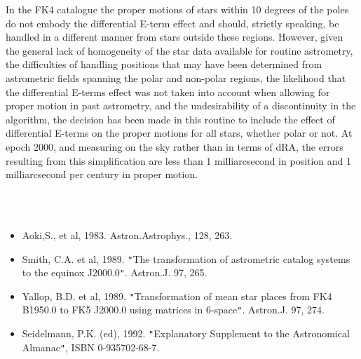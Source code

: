 \documentclass[twoside,11pt]{article}
\renewcommand{\_}{\texttt{\symbol{95}}}
\newcommand{\sstdiytopic}[2]{\item[{\hspace{-0.35em}#1\hspace{-0.35em}:}]
\mbox{} \\[1.3ex] #2}
\newcommand{\sstitemlist}[1]{
  \mbox{} \\
  \vspace{-3.5ex}
  \begin{itemize}
     #1
  \end{itemize}
}
\newcommand{\sstitem}{\item}
\newcommand{\sstdiytopic}[2]{\item[{#1}] #2 }
\newcommand{\sstitemlist}[1]{
      \begin{itemize}
         #1
      \end{itemize}
      \\
   }
\newcommand{\sstitem}{\item}
\begin{document}
{{{         \sstitem
         In the FK4 catalogue the proper motions of stars within 10
         degrees of the poles do not embody the differential E-term effect
         and should, strictly speaking, be handled in a different manner
         from stars outside these regions. However, given the general lack
         of homogeneity of the star data available for routine astrometry,
         the difficulties of handling positions that may have been
         determined from astrometric fields spanning the polar and non-polar
         regions, the likelihood that the differential E-terms effect was not
         taken into account when allowing for proper motion in past
         astrometry, and the undesirability of a discontinuity in the
         algorithm, the decision has been made in this routine to include the
         effect of differential E-terms on the proper motions for all stars,
         whether polar or not.  At epoch 2000, and measuring on the sky rather
         than in terms of dRA, the errors resulting from this simplification
         are less than 1 milliarcsecond in position and 1 milliarcsecond per
         century in proper motion.
      }
   }
   \sstdiytopic{
      References
   }{
      \sstitemlist{

         \sstitem
         Aoki,S., et al, 1983.  Astron.Astrophys., 128, 263.

         \sstitem
         Smith, C.A. et al, 1989.  {\tt "}The transformation of astrometric
           catalog systems to the equinox J2000.0{\tt "}.  Astron.J. 97, 265.

         \sstitem
         Yallop, B.D. et al, 1989.  {\tt "}Transformation of mean star places
           from FK4 B1950.0 to FK5 J2000.0 using matrices in 6-space{\tt "}.
           Astron.J. 97, 274.

         \sstitem
         Seidelmann, P.K. (ed), 1992.  {\tt "}Explanatory Supplement to
           the Astronomical Almanac{\tt "}, ISBN 0-935702-68-7.
      }
   }
}
\end{document}
